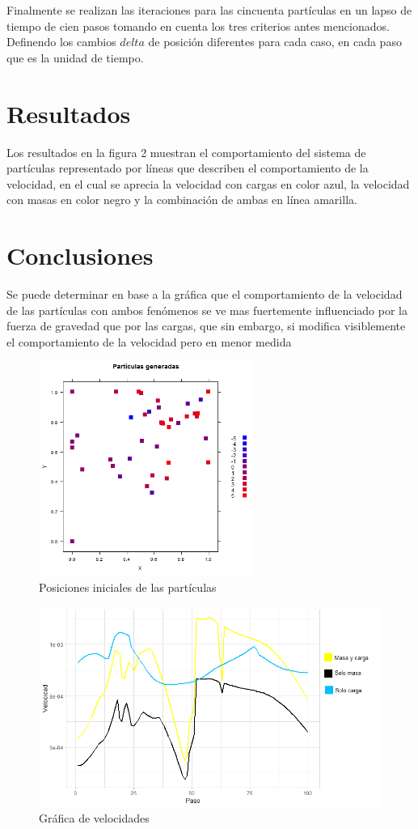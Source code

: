 \documentclass{article}
\begin{document}




Finalmente se realizan las iteraciones para las cincuenta partículas en un lapso de tiempo de cien pasos tomando en cuenta los tres criterios antes mencionados. Definendo los cambios $delta$ de posición diferentes para cada caso, en cada paso que es la unidad de tiempo.




\section{Resultados}
Los resultados en la figura 2 muestran el comportamiento del sistema de partículas representado por líneas que describen el comportamiento de la velocidad, en el cual se aprecia la velocidad con cargas en color azul, la velocidad con masas en color negro y la combinación de ambas en línea amarilla.


\section{Conclusiones}
Se puede determinar en base a la gráfica que el comportamiento de la velocidad de las partículas con ambos fenómenos se ve mas fuertemente influenciado por la fuerza de gravedad que por las cargas, que sin embargo, si modifica visiblemente el comportamiento de la velocidad pero en menor medida
\begin{figure}[h]
\centering
\includegraphics[width=7cm, height=7cm]{p9i.png}
\caption{Posiciones iniciales de las partículas}
\end{figure}

\begin{figure}[!ht]
\centering
\includegraphics[width=12cm]{Grafica.png}
\caption{Gráfica de velocidades}
\end{figure}





\end{document}
